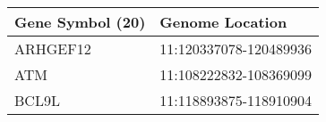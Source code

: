 \begin{tabular}{ll}
\toprule
Gene Symbol (20) &        Genome Location \\
\midrule
        ARHGEF12 & 11:120337078-120489936 \\
             ATM & 11:108222832-108369099 \\
           BCL9L & 11:118893875-118910904 \\
\bottomrule
\end{tabular}
